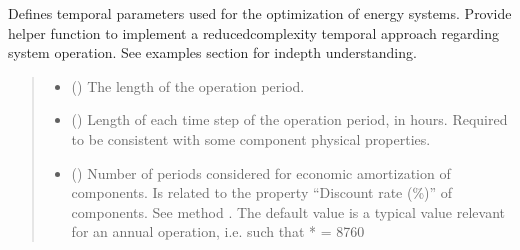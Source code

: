\documentclass[letterpaper,10pt,english]{sphinxmanual}
\begin{document}
\begin{fulllineitems}
\label{\detokenize{generated/tamos.TimeSettings:tamos.TimeSettings}}
\pysigstartsignatures
{}
\pysigstopsignatures{}

\begin{fulllineitems}
\label{\detokenize{generated/tamos.TimeSettings:tamos.TimeSettings.__init__}}
\pysigstartsignatures
{}
\pysigstopsignatures
\sphinxAtStartPar
Defines temporal parameters used for the optimization of energy systems.
Provide helper function to implement a reduced\sphinxhyphen{}complexity temporal approach regarding system operation.
See examples section for in\sphinxhyphen{}depth understanding.
\begin{quote}\begin{description}
\begin{itemize}
\item {} 
\sphinxAtStartPar
{} () \textendash{} The length of the operation period.

\item {} 
\sphinxAtStartPar
{} (\sphinxstyleliteralemphasis{\sphinxupquote{, }}\sphinxstyleliteralemphasis{\sphinxupquote{, }}) \textendash{} Length of each time step of the operation period, in hours.
Required to be consistent with some component physical properties.

\item {} 
\sphinxAtStartPar
{} (\sphinxstyleliteralemphasis{\sphinxupquote{, }}\sphinxstyleliteralemphasis{\sphinxupquote{, }}) \textendash{} Number of periods considered for economic amortization of components.
Is related to the property “Discount rate (\%)” of components. See method .
The default value  is a typical value relevant for an annual operation, i.e. such that  *  = 8760


\end{itemize}
\end{description}
\end{quote}
\end{fulllineitems}
\end{fulllineitems}
\end{document}
